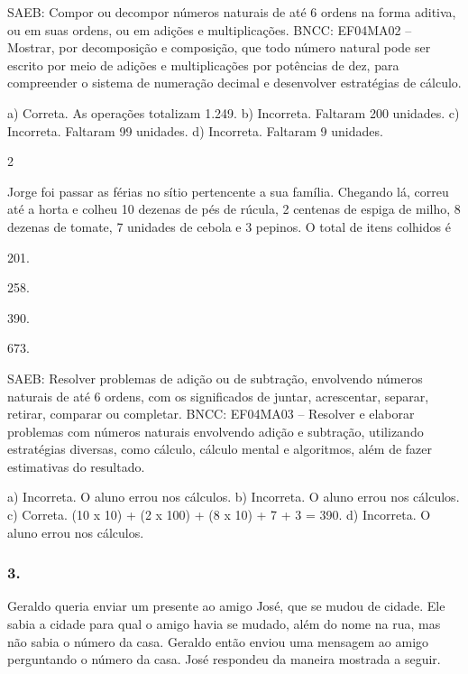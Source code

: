 \begin{mdframed}[linewidth=2pt,linecolor=salmao,roundcorner=2pt]
\begin{escolha}
{\begin{escolha}
\begin{escolha}
\end{escolha}

SAEB: Compor ou decompor números naturais de até 6 ordens na
forma aditiva, ou em suas ordens, ou em adições e multiplicações.
BNCC: EF04MA02 -- Mostrar, por decomposição e composição, que todo número natural pode ser escrito
por meio de adições e multiplicações por potências de dez, para compreender o sistema de
numeração decimal e desenvolver estratégias de cálculo.

a) Correta. As operações totalizam 1.249.
b) Incorreta. Faltaram 200 unidades.
c) Incorreta. Faltaram 99 unidades.
d) Incorreta. Faltaram 9 unidades.

\num{2}

Jorge foi passar as férias no sítio pertencente a sua família. Chegando lá,
correu até a horta e colheu 10 dezenas de pés de rúcula, 2 centenas de
espiga de milho, 8 dezenas de tomate, 7 unidades de cebola e 3 pepinos.
O total de itens colhidos é

\begin{escolha}
\item
  201.
\item
  258.
\item
  390.
\item
  673.
\end{escolha}

SAEB: Resolver problemas de adição ou de subtração,
envolvendo números naturais de até 6 ordens, com os significados de
juntar, acrescentar, separar, retirar, comparar ou completar.
BNCC: EF04MA03 -- Resolver e elaborar problemas com números naturais envolvendo adição e subtração,
utilizando estratégias diversas, como cálculo, cálculo mental e algoritmos, além de fazer estimativas
do resultado.

a) Incorreta. O aluno errou nos cálculos.
b) Incorreta. O aluno errou nos cálculos.
c) Correta. (10 x 10) + (2 x 100) + (8 x 10) + 7 + 3 = 390.
d) Incorreta. O aluno errou nos cálculos.

\subsubsection{3. }

Geraldo queria enviar um presente ao amigo José, que se mudou de cidade. Ele
sabia a cidade para qual o amigo havia se mudado, além do nome na rua, mas
não sabia o número da casa. Geraldo então enviou uma mensagem ao
amigo perguntando o número da casa. José respondeu da maneira mostrada a seguir.


\end{escolha}}
\end{escolha}
\end{mdframed}
